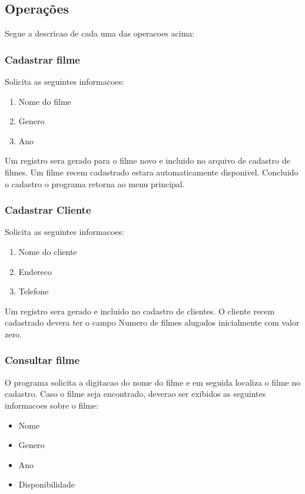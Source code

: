 \documentclass[a4paper,11pt]{article}
\begin{document}
\subsection{Operações}

Segue a descricao de cada uma das operacoes acima:

\subsubsection{Cadastrar filme}

Solicita as seguintes informacoes:

\begin{enumerate}
\item Nome do filme
\item Genero
\item Ano
\end{enumerate}

Um registro sera gerado para o filme novo e incluido no arquivo de cadastro de
filmes. Um filme recem cadastrado estara automaticamente disponivel. Concluido o
cadastro o programa retorna ao menu principal.

\subsubsection{Cadastrar Cliente}

Solicita as seguintes informacoes:

\begin{enumerate}
\item Nome do cliente
\item Endereco
\item Telefone
\end{enumerate}

Um registro sera gerado e incluido no cadastro de clientes. O cliente recem
cadastrado devera ter o campo Numero de filmes alugados inicialmente com valor
zero.

\subsubsection{Consultar filme}

O programa solicita a digitacao do nome do filme e em seguida
localiza o filme no cadastro. Caso o filme seja encontrado, deverao
ser exibidos as seguintes informacoes sobre o filme:

\begin{itemize}
\item Nome
\item Genero
\item Ano
\item Disponibilidade
\end{itemize}
\end{document}
